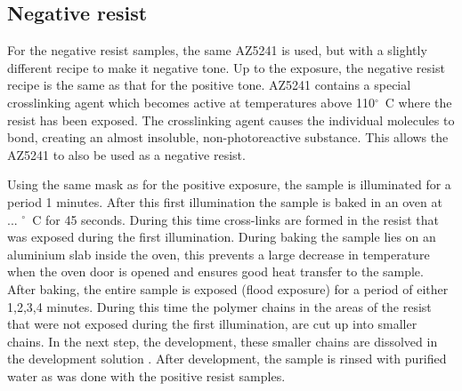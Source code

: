 \subsection*{Negative resist}
For the negative resist samples, the same AZ5241 is used, but with a slightly different recipe to make it negative tone. Up to the exposure, the negative resist recipe is the same as that for the positive tone. AZ5241 contains a special crosslinking agent which becomes active at temperatures above 110$^{\circ}$~C where the resist has been exposed. The crosslinking agent causes the individual molecules to bond, creating an almost insoluble, non-photoreactive substance. This allows the AZ5241 to also be used as a negative resist.

Using the same mask as for the positive exposure, the sample is illuminated for a period 1  minutes. After this first illumination the sample is baked in an oven at ...  $^\circ$~C for 45 seconds. During this time cross-links are formed in the resist that was exposed during the first illumination. During baking the sample lies on an aluminium slab inside the oven, this prevents a large decrease in temperature when the oven door is opened and ensures good heat transfer to the sample. After baking, the entire sample is exposed (flood exposure) for a period of either 1,2,3,4  minutes. During this time the polymer chains in the areas of the resist that were not exposed during the first illumination, are cut up into smaller chains. In the next step, the development, these smaller chains are dissolved in the development solution . After development, the sample is rinsed with purified water as was done with the positive resist samples.